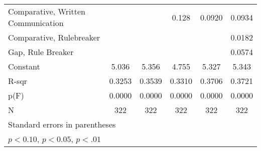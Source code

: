 {\begin{tabular}{l*{5}{c}}
\addlinespace
Comparative, Written Communication&                     &                     &       0.128         &      0.0920         &      0.0934         \\
\addlinespace
Comparative, Rulebreaker &                     &                     &                     &                     &      0.0182         \\
\addlinespace
Gap, Rule Breaker        &                     &                     &                     &                     &      0.0574         \\
\addlinespace
Constant                 &       5.036\sym{***}&       5.356\sym{***}&       4.755\sym{***}&       5.327\sym{***}&       5.343\sym{***}\\
\midrule
R-sqr                    &      0.3253         &      0.3539         &      0.3310         &      0.3706         &      0.3721         \\
p(F)                     &      0.0000         &      0.0000         &      0.0000         &      0.0000         &      0.0000         \\
N                        &         322         &         322         &         322         &         322         &         322         \\
\bottomrule
\multicolumn{6}{l}{\footnotesize Standard errors in parentheses}\\
\multicolumn{6}{l}{\footnotesize \sym{*} \(p<0.10\), \sym{**} \(p<0.05\), \sym{***} \(p<.01\)}\\
\end{tabular}
}
